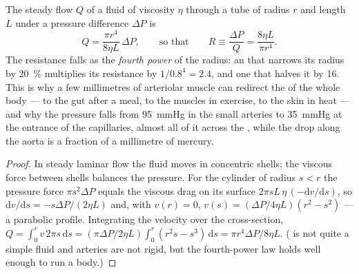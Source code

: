 \begin{theorem}\label{thm:b2:blood-circulation:poiseuille}
The steady flow $Q$ of a fluid of viscosity $\eta$ through a tube
of radius $r$ and length $L$ under a pressure difference $\Delta P$
is
\[
Q = \frac{\pi r^{4}}{8\eta L}\,\Delta P, \qquad \text{so that}\qquad
R \equiv \frac{\Delta P}{Q} = \frac{8\eta L}{\pi r^{4}} .
\]
The resistance falls as the \emph{fourth power} of the radius: an
 that narrows its radius by \qty{20}{\%} multiplies its
resistance by $1/0.8^{4} = 2.4$, and one that halves it by 16. This
is why a few millimetres of arteriolar muscle can redirect the
 of the whole body --- to the gut after a meal, to the muscles
in exercise, to the skin in heat --- and why the pressure falls from
\qty{95}{mmHg} in the small arteries to \qty{35}{mmHg} at the
entrance of the capillaries, almost all of it across the
, while the drop along the aorta is a fraction of a
millimetre of mercury.
\end{theorem}
\begin{proof}
In steady laminar flow the fluid moves in concentric shells; the
viscous force between shells balances the pressure. For the
cylinder of radius $s < r$ the pressure force $\pi s^{2}\Delta P$
equals the viscous drag on its surface $2\pi s L\,\eta\,(-\mathrm{d}v/
\mathrm{d}s)$, so $\mathrm{d}v/\mathrm{d}s = -s\Delta P/(2\eta L)$
and, with $v(r) = 0$, $v(s) = (\Delta P/4\eta L)(r^{2} - s^{2})$ --- a
parabolic profile. Integrating the velocity over the cross-section,
$Q = \int_{0}^{r} v\,2\pi s\,\mathrm{d}s = (\pi\Delta P/2\eta L)
\int_{0}^{r}(r^{2}s - s^{3})\,\mathrm{d}s = \pi r^{4}\Delta P/8\eta
L$. ( is not quite a simple fluid and arteries are not rigid,
but the fourth-power law holds well enough to run a body.)
\end{proof}

